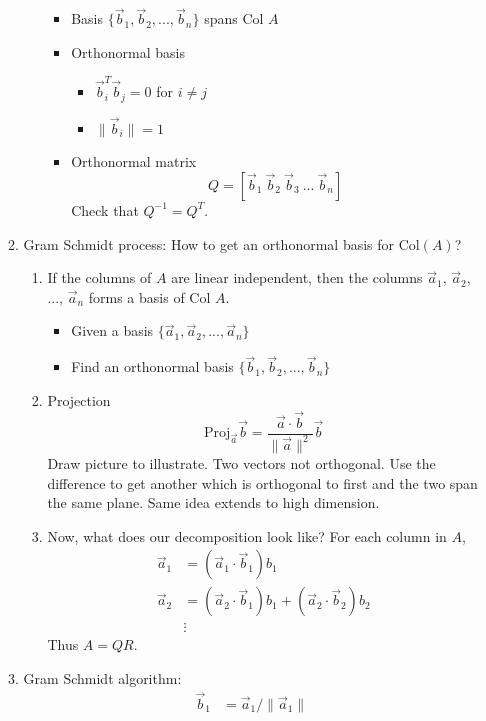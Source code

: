 \documentclass{article}
\theoremstyle{remark}
\begin{document}
\begin{enumerate}
\begin{enumerate}
\begin{enumerate}
\begin{itemize}
\item Basis $\{\vec b_1, \vec b_2,...,\vec b_n\}$ spans Col $A$
\item Orthonormal basis
\begin{itemize}
\item $\vec b_i^T\vec b_j = 0$ for $i\neq j$
\item $\|\vec b_i\| = 1$
\end{itemize}
\item Orthonormal matrix
$$
Q = [\vec b_1~\vec b_2 ~ \vec b_3~...~\vec b_n]
$$
Check that $Q^{-1} = Q^T$.
\end{itemize}
\end{enumerate}
\item Gram Schmidt process: How to get an orthonormal basis for Col$(A)$?
\begin{enumerate}
\item If the columns of $A$ are linear independent, then the columns $\vec a_1$, $\vec a_2$, ..., $\vec a_n$ forms a basis of Col $A$.
\begin{itemize}
\item Given a basis $\{\vec a_1,\vec a_2,..., \vec a_n\}$
\item Find an orthonormal basis $\{\vec b_1, \vec b_2,...,\vec b_n\}$
\end{itemize}
\item Projection
$$
\text{Proj}_{\vec a}\vec b = \frac{\vec a\cdot \vec b}{\|\vec a\|^2}\vec b
$$
Draw picture to illustrate. Two vectors not orthogonal. Use the difference to get another which is orthogonal to first and the two span the same plane. Same idea extends to high dimension.
\item Now, what does our decomposition look like? For each column in $A$,
\begin{align*}
\vec{a}_1 &= \left(\vec{a}_1 \cdot \vec{b}_1\right) b_1 \\
\vec{a}_2 &= \left(\vec{a}_2 \cdot \vec{b}_1\right) b_1 + \left(\vec{a}_2 \cdot \vec{b}_2\right) b_2 \\
&\vdots
\end{align*}
Thus $A=QR$.
\end{enumerate}
\item Gram Schmidt algorithm: 
\begin{equation*}
\begin{split}
\vec b_1 &= \vec a_1/\|\vec a_1\|\\ 

\end{split}
\end{equation*}
\end{enumerate}
\end{enumerate}
\end{document}
